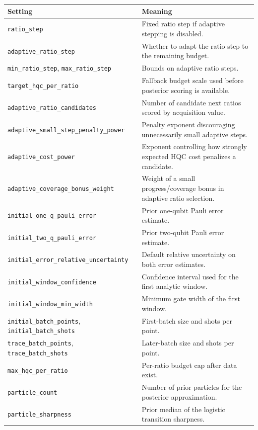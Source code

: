\documentclass[11pt]{article}
\begin{document}
\begin{center}
\begin{tabular}{p{}p{}}
\toprule
Setting & Meaning \\
\midrule
\texttt{ratio\_step} & Fixed ratio step if adaptive stepping is disabled. \\
\texttt{adaptive\_ratio\_step} & Whether to adapt the ratio step to the remaining budget. \\
\texttt{min\_ratio\_step}, \texttt{max\_ratio\_step} & Bounds on adaptive ratio steps. \\
\texttt{target\_hqc\_per\_ratio} & Fallback budget scale used before posterior scoring is available. \\
\texttt{adaptive\_ratio\_candidates} & Number of candidate next ratios scored by acquisition value. \\
\texttt{adaptive\_small\_step\_penalty\_power} & Penalty exponent discouraging unnecessarily small adaptive steps. \\
\texttt{adaptive\_cost\_power} & Exponent controlling how strongly expected HQC cost penalizes a candidate. \\
\texttt{adaptive\_coverage\_bonus\_weight} & Weight of a small progress/coverage bonus in adaptive ratio selection. \\
\texttt{initial\_one\_q\_pauli\_error} & Prior one-qubit Pauli error estimate. \\
\texttt{initial\_two\_q\_pauli\_error} & Prior two-qubit Pauli error estimate. \\
\texttt{initial\_error\_relative\_uncertainty} & Default relative uncertainty on both error estimates. \\
\texttt{initial\_window\_confidence} & Confidence interval used for the first analytic window. \\
\texttt{initial\_window\_min\_width} & Minimum gate width of the first window. \\
\texttt{initial\_batch\_points}, \texttt{initial\_batch\_shots} & First-batch size and shots per point. \\
\texttt{trace\_batch\_points}, \texttt{trace\_batch\_shots} & Later-batch size and shots per point. \\
\texttt{max\_hqc\_per\_ratio} & Per-ratio budget cap after data exist. \\
\texttt{particle\_count} & Number of prior particles for the posterior approximation. \\
\texttt{particle\_sharpness} & Prior median of the logistic transition sharpness. \\

\end{tabular}
\end{center}
\end{document}
